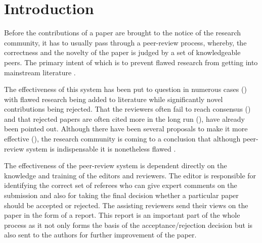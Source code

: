 %
\section{Introduction}
\label{introduction}

Before the contributions of a paper are brought to the notice of the research community, it has to usually pass through a peer-review process, whereby, the correctness and the novelty of the paper is judged by a set of knowledgeable peers. The primary intent of which is to prevent flawed research from getting into mainstream literature \cite{kassirer1994peer}. 

The effectiveness of this system has been put to question in numerous cases (\cite{ingelfinger1974peer,relman1989good,smith2006peer}) with flawed research being added to literature while significantly novel contributions being rejected. That the reviewers often fail to reach consensus (\cite{cole1981chance}) and that rejected papers are often cited more in the long run (\cite{braatz2014papers}), have already been pointed out. Although there have been several proposals to make it more effective (\cite{caswellimproving,graffy2006improving,mcnutt1990effects}), 
the research community is coming to a conclusion that although peer-review system is indispensable it is nonetheless flawed \cite{bacchetti2002peer}. 

 The effectiveness of the peer-review system is dependent directly on the knowledge and training of the editors and reviewers. The editor is responsible for identifying the correct set of referees who can give expert comments on the submission and also for taking the final decision whether a particular paper should be accepted or rejected. The assisting reviewers send their views on the paper in the form of a report. This report is an important part of the whole process as it not only forms the basis of the acceptance/rejection decision but is also sent to the authors for further improvement of the paper.  

